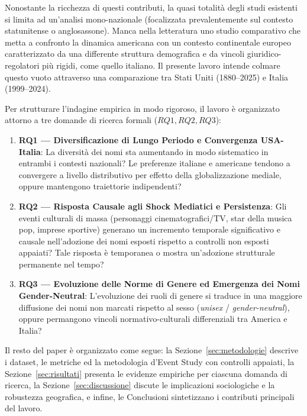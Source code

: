 \documentclass[conference]{IEEEtran}
\begin{document}
Nonostante la ricchezza di questi contributi, la quasi totalità degli studi esistenti si limita ad 
un'analisi mono-nazionale (focalizzata prevalentemente sul contesto statunitense o anglosassone). 
Manca nella letteratura uno studio comparativo che metta a confronto la dinamica americana 
con un contesto continentale europeo caratterizzato da una differente struttura demografica e da vincoli 
giuridico-regolatori più rigidi, come quello italiano. 
Il presente lavoro intende colmare questo vuoto attraverso una comparazione tra 
Stati Uniti (1880--2025) e Italia (1999--2024).

Per strutturare l'indagine empirica in modo rigoroso, il lavoro è organizzato attorno a tre domande 
di ricerca formali ($RQ1, RQ2, RQ3$):

\begin{enumerate}
  \item \textbf{RQ1 --- Diversificazione di Lungo Periodo e Convergenza USA-Italia}: 
  La diversità dei nomi sta aumentando in modo sistematico in entrambi i contesti nazionali? 
  Le preferenze italiane e americane tendono a convergere a livello distributivo per effetto della 
  globalizzazione mediale, oppure mantengono traiettorie indipendenti?
  \item \textbf{RQ2 --- Risposta Causale agli Shock Mediatici e Persistenza}: 
  Gli eventi culturali di massa (personaggi cinematografici/TV, star della musica pop, imprese sportive) 
  generano un incremento temporale significativo e causale nell'adozione dei nomi esposti rispetto a 
  controlli non esposti appaiati? Tale risposta è temporanea o mostra un'adozione strutturale 
  permanente nel tempo?
  \item \textbf{RQ3 --- Evoluzione delle Norme di Genere ed Emergenza dei Nomi Gender-Neutral}: 
  L'evoluzione dei ruoli di genere si traduce in una maggiore diffusione dei nomi non marcati rispetto 
  al sesso (\emph{unisex} / \emph{gender-neutral}), oppure permangono vincoli normativo-culturali 
  differenziali tra America e Italia?
\end{enumerate}

Il resto del paper è organizzato come segue: la Sezione~\ref{sec:metodologie} descrive i dataset, 
le metriche ed la metodologia d'Event Study con controlli appaiati, la Sezione~\ref{sec:risultati} 
presenta le evidenze empiriche per ciascuna domanda di ricerca, la Sezione~\ref{sec:discussione} 
discute le implicazioni sociologiche e la robustezza geografica, e infine, le Conclusioni sintetizzano 
i contributi principali del lavoro.
\end{document}
